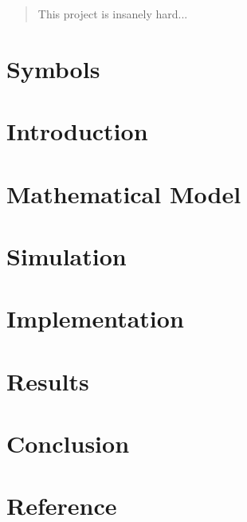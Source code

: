 \begin{abstract}
This project is insanely hard...
\end{abstract}
\tableofcontents
\section{Symbols}

\section{Introduction}

\section{Mathematical Model}

\section{Simulation}

\section{Implementation}

\section{Results}

\section{Conclusion}

\section{Reference}



